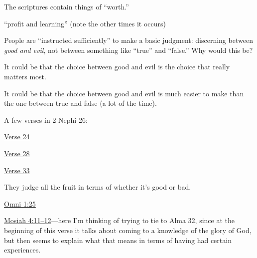 \begin{compactdesc}
			\item[{\hyperref[1NEPHI-6-6]{1 Nephi 6:6}}] \phantom{.}
				\begin{compactitem}
					\item The scriptures contain things of ``worth.''
				\end{compactitem}
			\item[{\hyperref[1NEPHI-19-23]{1 Nephi 19:23}}] ``profit and learning'' (note the other times it occurs)
			\item[{\hyperref[2NEPHI-2-5]{2 Nephi 2:5}}] People are ``instructed sufficiently'' to make a basic judgment: discerning between \textit{good and evil}, not between something like ``true'' and ``false.'' Why would this be?
				\begin{compactitem}
					\item It could be that the choice between good and evil is the choice that really matters most.
					\item It could be that the choice between good and evil is much easier to make than the one between true and false (a lot of the time).
				\end{compactitem}
			\item[{\hyperref[2NEPHI-9-28]{2 Nephi 9:28}}]
			\item A few verses in 2 Nephi 26: 
				\begin{compactitem}
					\item \hyperref[2NEPHI-26-24]{Verse 24}
					\item \hyperref[2NEPHI-26-28]{Verse 28}
					\item \hyperref[2NEPHI-26-33]{Verse 33}
				\end{compactitem}
			\item[{\hyperref[2NEPHI-33-4]{2 Nephi 33:4}}]
			\item[{\hyperref[JACOB-5]{Jacob 5}}] \phantom{.}
				\begin{compactitem}
					\item They judge all the fruit in terms of whether it's good or bad.
				\end{compactitem}
			\item \hyperref[OMNI-1-25]{Omni 1:25}
			\item \hyperref[MOSIAH-4-11]{Mosiah 4:11--12}---here I'm thinking of trying to tie to Alma 32, since at the beginning of this verse it talks about coming to a knowledge of the glory of God, but then seems to explain what that means in terms of having had certain experiences.
				\begin{compactitem}

\end{compactitem}
\end{compactdesc}
